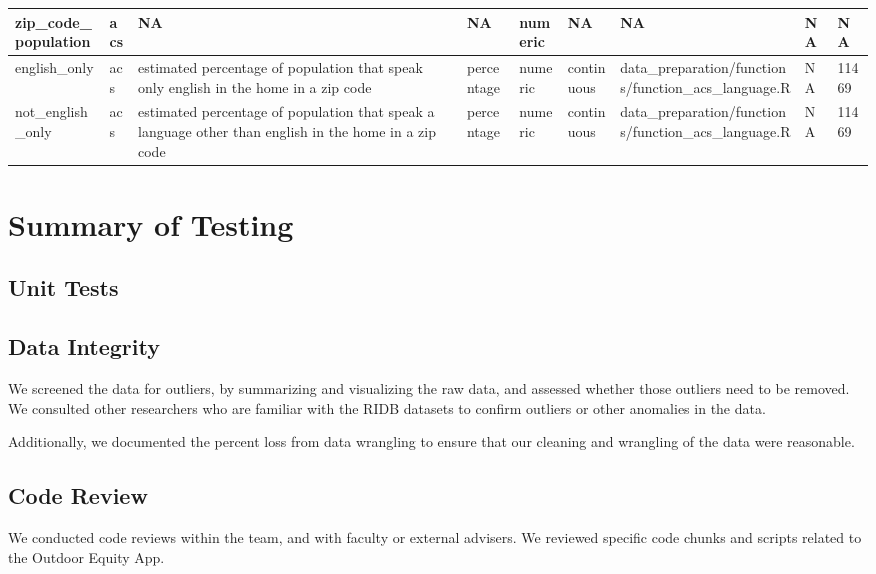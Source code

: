 \documentclass[
]{book}
\begin{document}
\begin{table}
\begin{tabular}[t]{l|l|l|l|l|l|l|l|l}
\hline
zip\_code\_population & acs & NA & NA & numeric & NA & NA & NA & NA\\
\hline
english\_only & acs & estimated percentage of population that speak only english in the home in a zip code & percentage & numeric & continuous & data\_preparation/functions/function\_acs\_language.R & NA & 11469\\
\hline
not\_english\_only & acs & estimated percentage of population that speak a language other than english in the home in a zip code & percentage & numeric & continuous & data\_preparation/functions/function\_acs\_language.R & NA & 11469\\
\hline
\end{tabular}
\end{table}

\hypertarget{summary-of-testing}{%
\chapter{Summary of Testing}\label{summary-of-testing}}

\hypertarget{unit-tests}{%
\section{Unit Tests}\label{unit-tests}}

\hypertarget{data-integrity}{%
\section{Data Integrity}\label{data-integrity}}

We screened the data for outliers, by summarizing and visualizing the raw data, and assessed whether those outliers need to be removed. We consulted other researchers who are familiar with the RIDB datasets to confirm outliers or other anomalies in the data.

Additionally, we documented the percent loss from data wrangling to ensure that our cleaning and wrangling of the data were reasonable.

\hypertarget{code-review}{%
\section{Code Review}\label{code-review}}

We conducted code reviews within the team, and with faculty or external advisers. We reviewed specific code chunks and scripts related to the Outdoor Equity App.
\end{document}
